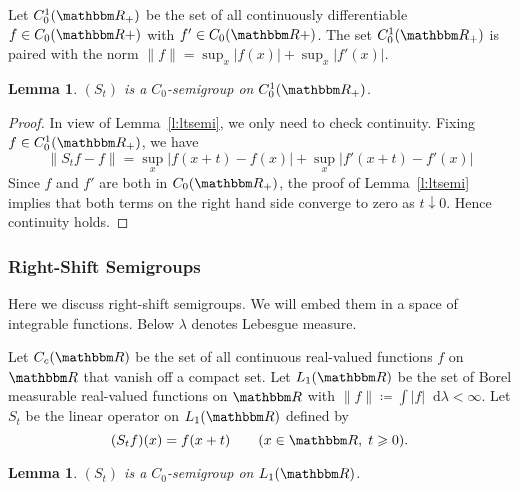 \documentclass[12pt, reqno]{amsart}
\renewcommand{\geq}{\geqslant}
\newcommand{\1}{\mathbbm 1}
\newcommand*\diff{\mathop{}\!\mathrm{d}}
\newcommand{\RR}{\mathbbm R}
\theoremstyle{plain}
\newtheorem{lemma}[theorem]{Lemma}
\theoremstyle{definition}
\begin{document}
Let $C_0^1(\RR_+)$ be the set of all continuously differentiable $f \in
C_0(\RR+)$ with $f' \in C_0(\RR+)$.  The set $C_0^1(\RR_+)$ is paired
with the norm $\|f\| = \sup_x |f(x)| + \sup_x |f'(x)|$.  

\begin{lemma}\label{l:ltsemi2}
    $(S_t)$ is a $C_0$-semigroup on $C_0^1(\RR_+)$.  
\end{lemma}

\begin{proof}
    In view of Lemma~\ref{l:ltsemi}, we only need to check continuity.
    Fixing $f \in C_0^1(\RR_+)$, we have
    \begin{equation*}
        \| S_t f - f \|
        = \sup_x | f(x + t)  - f(x) | + \sup_x | f'(x + t)  - f'(x) |
    \end{equation*}
    Since $f$ and $f'$ are both in $C_0(\RR_+)$, the proof of
    Lemma~\ref{l:ltsemi} implies that both terms on the right hand side
    converge to zero as $t \downarrow 0$.  Hence continuity holds.
\end{proof}

\subsubsection{Right-Shift Semigroups}\label{ss:rssemi}

Here we discuss right-shift semigroups.  We will embed them in a space of
integrable functions.  Below $\lambda$ denotes Lebesgue measure.

Let $C_c(\RR)$ be the set of all continuous real-valued functions $f$ on
$\RR$ that vanish off a compact set.  Let $L_1(\RR)$ be the set of 
Borel measurable real-valued functions on $\RR$ with $\| f \| \coloneq \int
|f| \diff \lambda < \infty$.  Let $S_t$ be the linear operator on $L_1(\RR)$
defined by 
%
\begin{equation*}
    (S_t f)(x) = f(x + t)
    \qquad (x \in \RR, \; t \geq 0).
\end{equation*}
%

\begin{lemma}\label{l:rtsemi}
    $(S_t)$ is a $C_0$-semigroup on $L_1(\RR)$.  
\end{lemma}
\end{document}
